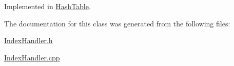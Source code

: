 Implemented in \hyperlink{class_hash_table_a3e63955ddf861d2feb8e6db908c19ac9}{Hash\+Table}.



The documentation for this class was generated from the following files\+:\begin{DoxyCompactItemize}
\item 
\hyperlink{_index_handler_8h}{Index\+Handler.\+h}\item 
\hyperlink{_index_handler_8cpp}{Index\+Handler.\+cpp}\end{DoxyCompactItemize}
